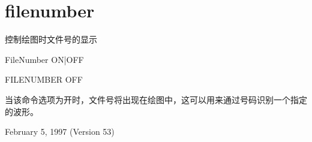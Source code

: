 \section{filenumber}
\label{cmd:filenumber}

控制绘图时文件号的显示

FileNumber {ON|OFF}

FILENUMBER OFF

当该命令选项为开时，文件号将出现在绘图中，这可以用来通过号码识别一个指定的波形。

February 5, 1997 (Version 53)

